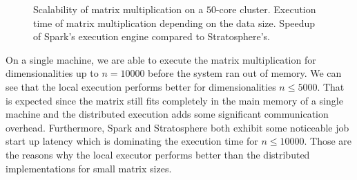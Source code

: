 \begin{figure}
	\centering
	\begin{subfigure}{\dualpgfwidth}
		\caption{}
		\label{fig:mmLoadRuntime}
	\end{subfigure}
	\begin{subfigure}{\dualpgfwidth}
		\caption{}
		\label{fig:mmSpeedup}
	\end{subfigure}
	\caption{Scalability of matrix multiplication on a $50$-core cluster.  Execution time of matrix multiplication depending on the data size.  Speedup of Spark's execution engine compared to Stratosphere's.}
	\label{fig:mmBenchmark}
\end{figure}

On a single machine, we are able to execute the matrix multiplication for dimensionalities up to $n=10000$ before the system ran out of memory.
We can see that the local execution performs better for dimensionalities $n \le 5000$.
That is expected since the matrix still fits completely in the main memory of a single machine and the distributed execution adds some significant communication overhead.
Furthermore, Spark and Stratosphere both exhibit some noticeable job start up latency which is dominating the execution time for $n\le 10000$.
Those are the reasons why the local executor performs better than the distributed implementations for small matrix sizes.

